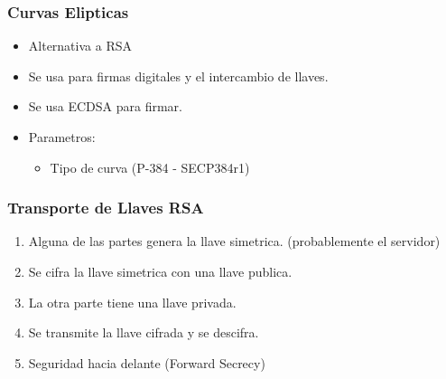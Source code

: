 \documentclass[11pt]{article}
\begin{document}
\subsubsection{Curvas Elipticas}
\label{sec:org29e0143}
\begin{itemize}
\item Alternativa a RSA
\item Se usa para firmas digitales y el intercambio de llaves.
\item Se usa ECDSA para firmar.
\item Parametros:
\begin{itemize}
\item Tipo de curva (P-384 - SECP384r1)
\end{itemize}
\end{itemize}
\subsubsection{Transporte de Llaves RSA}
\label{sec:org7912280}
\begin{enumerate}
\item Alguna de las partes genera la llave simetrica. (probablemente el servidor)
\item Se cifra la llave simetrica con una llave publica.
\item La otra parte tiene una llave privada.
\item Se transmite la llave cifrada y se descifra.
\item Seguridad hacia delante (Forward Secrecy)
\end{enumerate}
\end{document}
